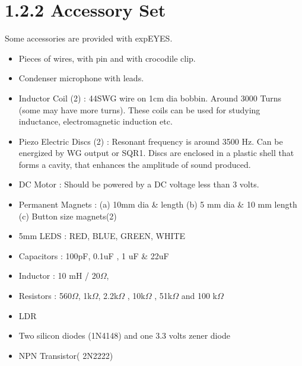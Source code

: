 \documentclass[a4paper,12pt,english]{sphinxmanual}
\begin{document}
\section{1.2.2 Accessory Set}
\label{\detokenize{1.2:accessory-set}}
Some accessories are provided with expEYES.
\begin{itemize}
\item {} 
Pieces of wires, with pin and with crocodile clip.

\item {} 
Condenser microphone with leads.

\item {} 
Inductor Coil (2) : 44SWG wire on 1cm dia bobbin. Around 3000 Turns
(some may have more turns). These coils can be used for studying
inductance, electromagnetic induction etc.

\item {} 
Piezo Electric Discs (2) : Resonant frequency is around 3500 Hz. Can
be energized by WG output or SQR1. Discs are enclosed in a plastic
shell that forms a cavity, that enhances the amplitude of sound
produced.

\item {} 
DC Motor : Should be powered by a DC voltage less than 3 volts.

\item {} 
Permanent Magnets : (a) 10mm dia \& length (b) 5 mm dia \& 10 mm length (c)
Button size magnets(2)

\item {} 
5mm LEDS : RED, BLUE, GREEN, WHITE

\item {} 
Capacitors : 100pF, 0.1uF , 1 uF \& 22uF

\item {} 
Inductor : 10 mH / 20\(\Omega\),

\item {} 
Resistors : 560\(\Omega\), 1k\(\Omega\), 2.2k\(\Omega\) , 10k\(\Omega\) , 51k\(\Omega\) and 100 k\(\Omega\)

\item {} 
LDR

\item {} 
Two silicon diodes (1N4148) and one 3.3 volts zener diode

\item {} 
NPN Transistor( 2N2222)

\end{itemize}
\end{document}
